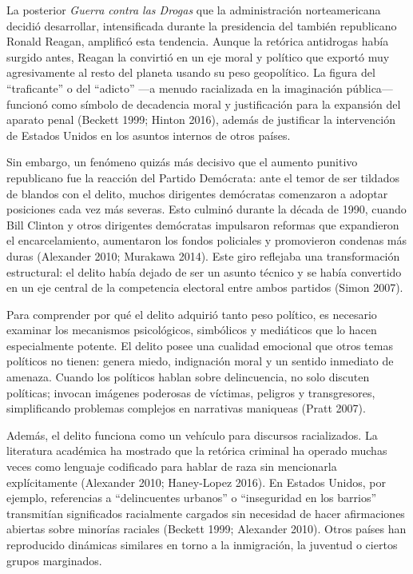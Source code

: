 \documentclass[
  spanish,
  letterpaper,
  DIV=11,
  numbers=noendperiod]{scrreprt}
\begin{document}
La posterior \emph{Guerra contra las Drogas} que la administración
norteamericana decidió desarrollar, intensificada durante la presidencia
del también republicano Ronald Reagan, amplificó esta tendencia. Aunque
la retórica antidrogas había surgido antes, Reagan la convirtió en un
eje moral y político que exportó muy agresivamente al resto del planeta
usando su peso geopolítico. La figura del ``traficante'' o del
``adicto'' ---a menudo racializada en la imaginación pública--- funcionó
como símbolo de decadencia moral y justificación para la expansión del
aparato penal (Beckett 1999; Hinton 2016), además de justificar la
intervención de Estados Unidos en los asuntos internos de otros países.

Sin embargo, un fenómeno quizás más decisivo que el aumento punitivo
republicano fue la reacción del Partido Demócrata: ante el temor de ser
tildados de blandos con el delito, muchos dirigentes demócratas
comenzaron a adoptar posiciones cada vez más severas. Esto culminó
durante la década de 1990, cuando Bill Clinton y otros dirigentes
demócratas impulsaron reformas que expandieron el encarcelamiento,
aumentaron los fondos policiales y promovieron condenas más duras
(Alexander 2010; Murakawa 2014). Este giro reflejaba una transformación
estructural: el delito había dejado de ser un asunto técnico y se había
convertido en un eje central de la competencia electoral entre ambos
partidos (Simon 2007).

Para comprender por qué el delito adquirió tanto peso político, es
necesario examinar los mecanismos psicológicos, simbólicos y mediáticos
que lo hacen especialmente potente. El delito posee una cualidad
emocional que otros temas políticos no tienen: genera miedo, indignación
moral y un sentido inmediato de amenaza. Cuando los políticos hablan
sobre delincuencia, no solo discuten políticas; invocan imágenes
poderosas de víctimas, peligros y transgresores, simplificando problemas
complejos en narrativas maniqueas (Pratt 2007).

Además, el delito funciona como un vehículo para discursos racializados.
La literatura académica ha mostrado que la retórica criminal ha operado
muchas veces como lenguaje codificado para hablar de raza sin
mencionarla explícitamente (Alexander 2010; Haney-Lopez 2016). En
Estados Unidos, por ejemplo, referencias a ``delincuentes urbanos'' o
``inseguridad en los barrios'' transmitían significados racialmente
cargados sin necesidad de hacer afirmaciones abiertas sobre minorías
raciales (Beckett 1999; Alexander 2010). Otros países han reproducido
dinámicas similares en torno a la inmigración, la juventud o ciertos
grupos marginados.
\end{document}
